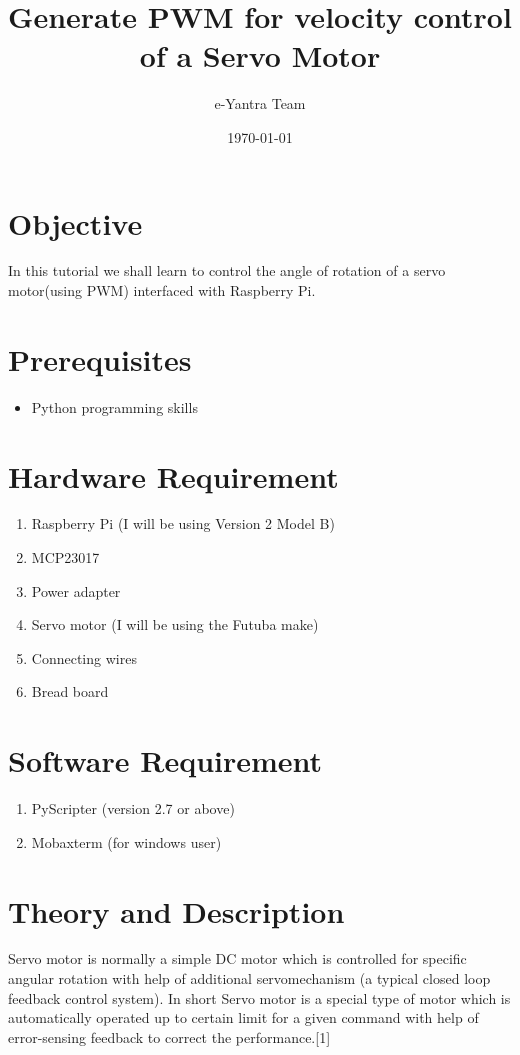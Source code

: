 \documentclass[11pt,a4paper]{article}
\title{Generate PWM for velocity control of a Servo Motor}
\author{e-Yantra Team}
\date{\today}
\begin{document}
	\maketitle
	\newpage
	\tableofcontents
	\newpage
	
	\section{Objective}
	In this tutorial we shall learn to control the angle of rotation of a servo motor(using PWM) interfaced with Raspberry Pi. 
	
	\section{Prerequisites}
	\begin{itemize}
		\item Python programming skills
    \end{itemize}
	
	\section{Hardware Requirement}
	\begin{enumerate}
		\item Raspberry Pi (I will be using Version 2 Model B)
		\item MCP23017
		\item Power adapter
		\item Servo motor (I will be using the Futuba make)
		\item Connecting wires
		\item Bread board
	\end{enumerate}
	
	\section{Software Requirement}
	\begin{enumerate}
		\item PyScripter (version 2.7 or above)
		\item Mobaxterm (for windows user)
	\end{enumerate}
	
	\newpage
	\section{Theory and Description}
	Servo motor is normally a simple DC motor which is controlled for specific angular rotation with help of additional servomechanism (a typical closed loop feedback control system). 
	\newline
	In short Servo motor is a special type of motor which is automatically operated up to certain limit for a given command with help of error-sensing feedback to correct the performance.[1]
	
\end{document}
